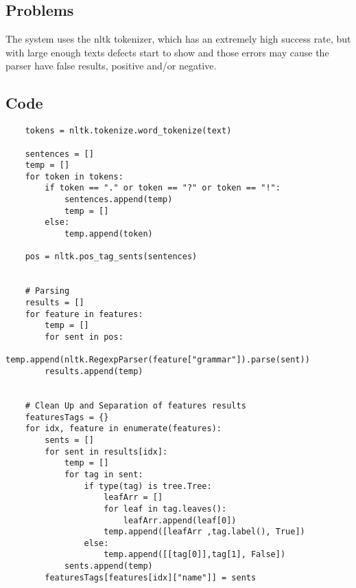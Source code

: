 \subsection{Problems}
The system uses the nltk tokenizer, which has an extremely high success rate, but with large enough texts defects start to show and those errors may cause the parser have false results, positive and/or negative.

\subsection{Code}
\begin{verbatim}
    tokens = nltk.tokenize.word_tokenize(text)

    sentences = []
    temp = []
    for token in tokens:
        if token == "." or token == "?" or token == "!":
            sentences.append(temp)
            temp = []
        else:
            temp.append(token)

    pos = nltk.pos_tag_sents(sentences)


    # Parsing
    results = []
    for feature in features:
        temp = []
        for sent in pos:
            temp.append(nltk.RegexpParser(feature["grammar"]).parse(sent))
        results.append(temp)


    # Clean Up and Separation of features results
    featuresTags = {}
    for idx, feature in enumerate(features):
        sents = []
        for sent in results[idx]:
            temp = []
            for tag in sent:
                if type(tag) is tree.Tree:
                    leafArr = []
                    for leaf in tag.leaves():
                        leafArr.append(leaf[0])
                    temp.append([leafArr ,tag.label(), True])
                else:
                    temp.append([[tag[0]],tag[1], False])
            sents.append(temp)
        featuresTags[features[idx]["name"]] = sents
\end{verbatim}